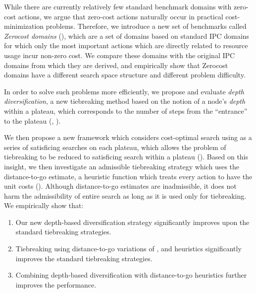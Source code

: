 While there are currently relatively few standard benchmark domains with zero-cost actions,
we argue that zero-cost actions naturally occur in
practical cost-minimization problems. Therefore, we introduce a new set of
benchmarks called \emph{Zerocost domains}
(), which are a set of domains based on standard IPC domains for which only the most important actions which are directly related to resource usage incur non-zero cost.
We compare these domains with the original IPC domains from which they are derived, and empirically show that 
Zerocost domains have a different search space structure and different
problem difficulty.

In order to solve such problems more efficiently, we propose and
evaluate \emph{depth diversification}, a new
tiebreaking method based on the notion of a node's \emph{depth} within a plateau,
which corresponds to the number of steps from the ``entrance'' to
the plateau (,
). 


We then propose a new framework which considers cost-optimal search using \astar 
as a series of satisficing searches on each plateau,
which allows the problem of tiebreaking to be reduced to satisficing search within a plateau ().
Based on this insight, we then investigate an
admissible tiebreaking strategy which uses the distance-to-go estimate, a heuristic function which treats every action
to have the unit costs ().
Although distance-to-go estimates are inadmissible,
it does not harm the admissibility of entire search as long as it is used only for tiebreaking.
% 
We empirically show that:
\begin{enumerate}
 \item Our new depth-based diversification strategy significantly improves upon the 
       standard tiebreaking strategies.
 \item Tiebreaking using distance-to-go variations of \lmcut, \mands and \ff heuristics
       significantly improves the standard tiebreaking strategies.
 \item Combining depth-based diversification with distance-to-go heuristics 
       further improves the performance.
\end{enumerate}

